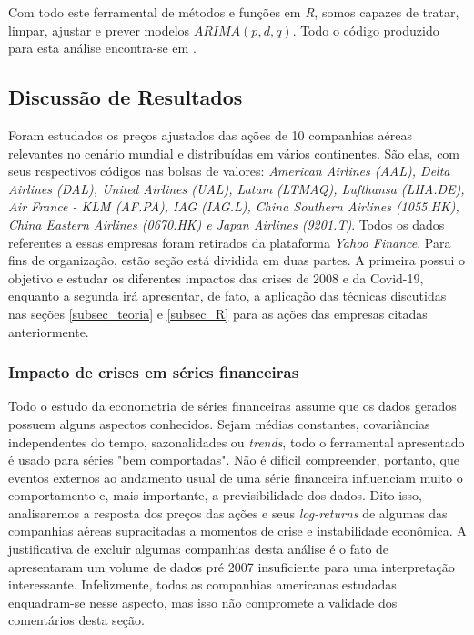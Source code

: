 \documentclass[12pt]{article}
\begin{document}
Com todo este ferramental de métodos e funções em \textit{R}, somos capazes de tratar, limpar, ajustar e prever modelos $ARIMA(p,d,q)$. Todo o código produzido para esta análise encontra-se em \cite{git}.

\subsection{Discussão de Resultados}\label{subsec_res}
Foram estudados os preços ajustados das ações de 10 companhias aéreas relevantes no cenário mundial e distribuídas em vários continentes. São elas, com seus respectivos códigos nas bolsas de valores: \emph{American Airlines (AAL), Delta Airlines (DAL), United Airlines (UAL), Latam (LTMAQ), Lufthansa (LHA.DE), Air France - KLM (AF.PA), IAG (IAG.L), China Southern Airlines (1055.HK), China Eastern Airlines (0670.HK) e Japan Airlines (9201.T)}. Todos os dados referentes a essas empresas foram retirados da plataforma \textit{Yahoo Finance}. Para fins de organização, estão seção está dividida em duas partes. A primeira possui o objetivo e estudar os diferentes impactos das crises de 2008 e da Covid-19, enquanto a segunda irá apresentar, de fato, a aplicação das técnicas discutidas nas seções \ref{subsec_teoria} e \ref{subsec_R} para as ações das empresas citadas anteriormente.

\subsubsection{Impacto de crises em séries financeiras}\label{subsec_crise}
Todo o estudo da econometria de séries financeiras \cite{Tsay} assume que os dados gerados possuem alguns aspectos conhecidos. Sejam médias constantes, covariâncias independentes do tempo, sazonalidades ou \textit{trends}, todo o ferramental apresentado é usado para séries "bem comportadas". Não é difícil compreender, portanto, que eventos externos ao andamento usual de uma série financeira influenciam muito o comportamento e, mais importante, a previsibilidade dos dados. Dito isso, analisaremos a resposta dos preços das ações e seus \textit{log-returns} de algumas das companhias aéreas supracitadas a momentos de crise e instabilidade econômica. A justificativa de excluir algumas companhias desta análise é o fato de apresentaram um volume de dados pré 2007 insuficiente para uma interpretação interessante. Infelizmente, todas as companhias americanas estudadas enquadram-se nesse aspecto, mas isso não compromete a validade dos comentários desta seção.
\end{document}
